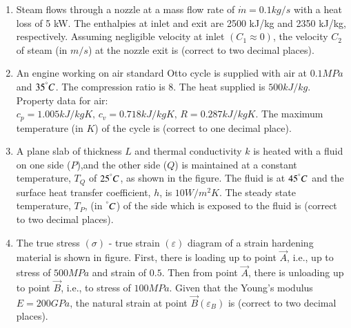 \documentclass[journal]{IEEEtran}
\begin{document}
\begin{enumerate}
    \item Steam flows through a nozzle at a mass flow rate of $\dot{m}=0.1kg/s$ with a heat loss of 5 kW. The enthalpies at inlet and exit are 2500 kJ/kg and 2350 kJ/kg, respectively. Assuming
        negligible velocity at inlet $(C_1\approx0)$, the velocity $C_2$ of steam (in $m/s$) at the nozzle exit is \underline{\hspace{1cm}} (correct to two decimal places).
        \begin{figure}[!ht]
            \centering
            
        \end{figure}

    \item An engine working on air standard Otto cycle is supplied with air at $0.1 MPa$ and $35^\degree C$. The compression ratio is $8$. The heat supplied is $500 kJ/kg$. Property data for air: $c_p = 1.005 kJ/kg K,\,c_v = 0.718 kJ/kg K,\,R = 0.287 kJ/kg K$. The maximum temperature (in $K$) of the cycle is \underline{\hspace{1cm}} (correct to one decimal place).

    \item A plane slab of thickness $L$ and thermal conductivity $k$ is heated with a fluid on one side ($P$),and the other side ($Q$) is maintained at a constant temperature, $T_{Q}$ of $25^\degree C$, as shown in the figure. The fluid is at $45^\degree C$ and the surface heat transfer coefficient, $h$, is $10 W/m^2K$. The steady state temperature, $T_{P}$, (in $^\degree C$) of the side which is exposed to the fluid is \underline{\hspace{1cm}} (correct to two decimal places).
        \begin{figure}[!ht]
            \centering
            
        \end{figure}

    \item The true stress $(\sigma)$ - true strain $(\varepsilon)$ diagram of a strain hardening material is shown in figure. First, there is loading up to point $\vec{A}$, i.e., up to stress of $500 MPa$ and strain of $0.5$. Then from point $\vec{A}$, there is unloading up to point $\vec{B}$, i.e., to stress of $100 MPa$. Given that the Young's modulus $E = 200 GPa$, the natural strain at point $\vec{B} (\varepsilon_{B})$ is \underline{\hspace{1cm}} (correct to two decimal places).
        \begin{figure}[!ht]
            \centering
            
        \end{figure}


\end{enumerate}
\end{document}
